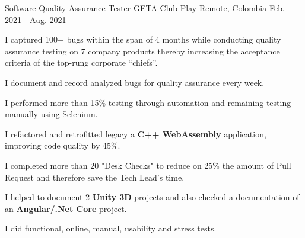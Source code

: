 \begin{cventries}
  \cventry
  {Software Quality Assurance Tester} %
  {GETA Club Play} %
  {Remote, Colombia} %
  {Feb. 2021 - Aug. 2021} %
  {
    \begin{cvitems} %
      \item {I captured 100+ bugs within the span of 4 months while conducting quality assurance
                  testing on 7 company products thereby increasing the acceptance criteria of the top-rung
                  corporate “chiefs”.}
      \item {I document and record analyzed bugs for quality assurance every week.}
      \item {I performed more than 15\% testing through automation and remaining testing manually
                  using Selenium.}
      \item {I refactored and retrofitted legacy a \textbf{C++ WebAssembly} application, improving code
                  quality by 45\%.}
      \item {I completed more than 20 "Desk Checks" to reduce on 25\% the amount of Pull Request
                  and therefore save the Tech Lead's time.}
      \item {I helped to document 2 \textbf{Unity 3D} projects and also checked a documentation of an
                  \textbf{Angular/.Net Core} project.}
      \item {I did functional, online, manual, usability and stress tests.}
    \end{cvitems}
  }
\end{cventries}
